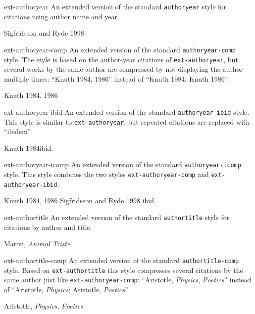 \documentclass{ltxdockit}
\def\sty{\texttt}
\begin{document}
\begin{marglist}
\item[ext-authoryear]
An extended version of the standard \sty{authoryear} style for citations
using author name and year.
\begin{tcolorbox}
Sigfridsson and Ryde 1998
\end{tcolorbox}

\item[ext-authoryear-comp]
An extended version of the standard \sty{authoryear-comp} style.
The style is based on the author-year citations of \sty{ext-authoryear},
but several works by the same author are compressed by not displaying the
author multiple times: \enquote{Knuth 1984, 1986} instead of
\enquote{Knuth 1984; Knuth 1986}.
\begin{tcolorbox}
Knuth 1984, 1986
\end{tcolorbox}

\item[ext-authoryear-ibid]
An extended version of the standard \sty{authoryear-ibid} style.
This style is similar to \sty{ext-authoryear}, but repeated citations are
replaced with \enquote{ibidem}.
\begin{tcolorbox}
Knuth 1984\quad ibid.
\end{tcolorbox}

\item[ext-authoryear-icomp]
An extended version of the standard \sty{authoryear-icomp} style.
This style combines the two styles \sty{ext-authoryear-comp} and
\sty{ext-authoryear-ibid}.
\begin{tcolorbox}
Knuth 1984, 1986 \quad Sigfridsson and Ryde 1998 \quad ibid.
\end{tcolorbox}

\item[ext-authortitle]
An extended version of the standard \sty{authortitle} style for citations
by author and title.
\begin{tcolorbox}
Maron, \emph{Animal Triste}
\end{tcolorbox}

\item[ext-authortitle-comp]
An extended version of the standard \sty{authortitle-comp} style.
Based on \sty{ext-authortitle} this style compresses several citations
by the same author just like \sty{ext-authoryear-comp}:
\enquote{Aristotle, \emph{Physics}, \emph{Poetics}} instead of
\enquote{Aristotle, \emph{Physics}; Aristotle, \emph{Poetics}}.
\begin{tcolorbox}
Aristotle, \emph{Physics}, \emph{Poetics}
\end{tcolorbox}


\end{marglist}
\end{document}
